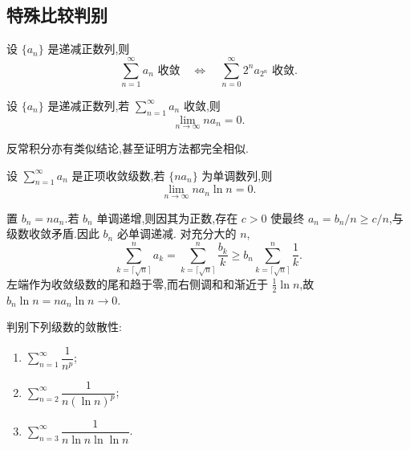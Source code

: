 \subsection{特殊比较判别}



\begin{theorem}
    设 $\{a_n\}$ 是递减正数列,则
    \[
        \displaystyle\sum\limits_{n=1}^{\infty}a_n\text{ 收敛}
        \quad\Longleftrightarrow\quad
        \sum\limits_{n=0}^{\infty}2^na_{2^n}\text{ 收敛}.
    \]
\end{theorem}

\begin{proposition}[\markstar]
    设 $\{a_n\}$ 是递减正数列,若 $\displaystyle\sum\limits_{n=1}^{\infty}a_n$ 收敛,则
    \[
        \displaystyle\lim\limits_{n\to\infty}na_n=0.
    \]
\end{proposition}

\begin{remark}
    反常积分亦有类似结论,甚至证明方法都完全相似.
\end{remark}

\begin{example}
    设 $\displaystyle\sum\limits_{n=1}^{\infty}a_n$ 是正项收敛级数,若 $\{na_n\}$ 为单调数列,则
    \[
        \displaystyle\lim\limits_{n\to\infty}na_n\ln n=0.
    \]
\end{example}
\exampleblank

\begin{solution}
    置 $b_n=na_n$.若 $b_n$ 单调递增,则因其为正数,存在 $c>0$ 使最终
    $a_n=b_n/n\geq c/n$,与级数收敛矛盾.因此 $b_n$ 必单调递减.
    对充分大的 $n$,
    \[
        \displaystyle\sum\limits_{k=\lceil\sqrt n\rceil}^{n}a_k
        =\sum\limits_{k=\lceil\sqrt n\rceil}^{n}\dfrac{b_k}{k}
        \geq b_n\sum\limits_{k=\lceil\sqrt n\rceil}^{n}\dfrac{1}{k}.
    \]
    左端作为收敛级数的尾和趋于零,而右侧调和和渐近于 $\frac{1}{2}\ln n$,故
    $b_n\ln n=na_n\ln n\to0$.
\end{solution}

\begin{example}
    判别下列级数的敛散性:
    \begin{enumerate}
        \item $\displaystyle\sum\limits_{n=1}^{\infty}\dfrac{1}{n^p}$;
        \item $\displaystyle\sum\limits_{n=2}^{\infty}\dfrac{1}{n(\ln n)^p}$;
        \item $\displaystyle\sum\limits_{n=3}^{\infty}\dfrac{1}{n\ln n\ln\ln n}$.
    \end{enumerate}
\end{example}
\exampleblank

